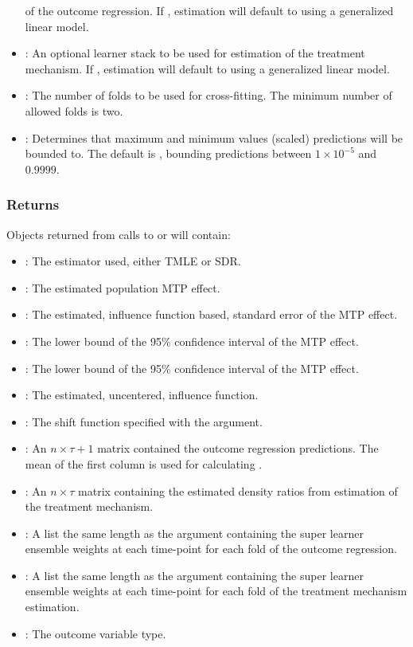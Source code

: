 \documentclass[]{jss}
\begin{document}
\begin{itemize}
  of the outcome regression. If , estimation will default to using a generalized linear model.
  \item {}: An optional  learner stack to be used for estimation
  of the treatment mechanism. If , estimation will default to using a generalized linear model.
  \item {}: The number of folds to be used for cross-fitting. The minimum number of allowed folds is two.
  \item {}: Determines that maximum and minimum values (scaled) predictions will be
  bounded to. The default is , bounding predictions between \(1\times10^{-5}\) and \(0.9999\).
  
\end{itemize}

\subsubsection{Returns}

Objects returned from calls to  or  will contain:

\begin{itemize}

  \item {}: The estimator used, either TMLE or SDR.
  \item {}: The estimated population MTP effect.
  \item {}: The estimated, influence function based, standard error of
  the MTP effect.
  \item {}: The lower bound of the 95\% confidence interval of the MTP effect.
  \item {}: The lower bound of the 95\% confidence interval of the MTP effect.
  \item {}: The estimated, uncentered, influence function.
  \item {}: The shift function specified with the  argument.
  \item {}: An \(n \times \tau + 1\) matrix contained the outcome regression
  predictions. The mean of the first column is used for calculating .
  \item {}: An \(n \times \tau\) matrix containing the estimated density
  ratios from estimation of the treatment mechanism.
  \item {}: A list the same length as the  argument containing the
  super learner ensemble weights at each time-point for each fold of the outcome regression.
  \item {}: A list the same length as the  argument containing the
  super learner ensemble weights at each time-point for each fold of the treatment mechanism
  estimation.
  \item {}: The outcome variable type.
  
\end{itemize}
\end{document}
